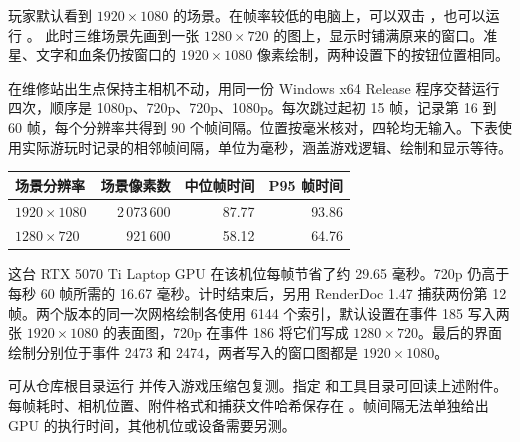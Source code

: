 玩家默认看到 $1920\times1080$ 的场景。在帧率较低的电脑上，可以双击
，也可以运行 。
此时三维场景先画到一张 $1280\times720$ 的图上，显示时铺满原来的窗口。准星、文字和血条仍按窗口的 $1920\times1080$ 像素绘制，两种设置下的按钮位置相同。

在维修站出生点保持主相机不动，用同一份 Windows x64 Release 程序交替运行四次，顺序是 1080p、720p、720p、1080p。每次跳过起初 15 帧，记录第 16 到 60 帧，每个分辨率共得到 90 个帧间隔。位置按毫米核对，四轮均无输入。下表使用实际游玩时记录的相邻帧间隔，单位为毫秒，涵盖游戏逻辑、绘制和显示等待。

\begin{center}
\begin{tabular}{lrrr}\toprule
场景分辨率 & 场景像素数 & 中位帧时间 & P95 帧时间\\\midrule
$1920\times1080$ & 2\,073\,600 & 87.77 & 93.86\\
$1280\times720$  &   921\,600 & 58.12 & 64.76\\\bottomrule
\end{tabular}
\end{center}

这台 RTX 5070 Ti Laptop GPU 在该机位每帧节省了约 29.65 毫秒。720p 仍高于每秒 60 帧所需的 16.67 毫秒。计时结束后，另用 RenderDoc 1.47 捕获两份第 12 帧。两个版本的同一次网格绘制各使用 6144 个索引，默认设置在事件 185 写入两张 $1920\times1080$ 的表面图，720p 在事件 186 将它们写成 $1280\times720$。最后的界面绘制分别位于事件 2473 和 2474，两者写入的窗口图都是 $1920\times1080$。

可从仓库根目录运行  并传入游戏压缩包复测。指定  和工具目录可回读上述附件。每帧耗时、相机位置、附件格式和捕获文件哈希保存在 。帧间隔无法单独给出 GPU 的执行时间，其他机位或设备需要另测。
